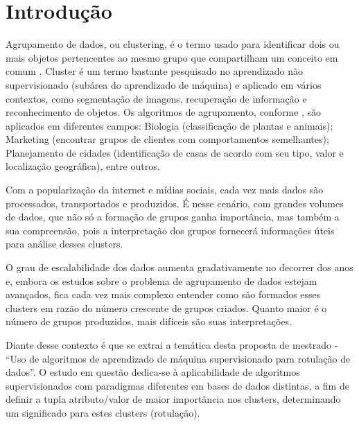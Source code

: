 

\chapter{Introdução} \label{cap:introd}

Agrupamento de dados, ou clustering, é o termo usado para identificar dois ou  mais objetos pertencentes ao mesmo grupo que compartilham um conceito em comum    \cite{Kumar2013}. Cluster é um termo bastante pesquisado no aprendizado não supervisionado (subárea do aprendizado de máquina) e aplicado em vários contextos, como segmentação de imagens, recuperação de informação e reconhecimento de objetos. Os algoritmos de agrupamento, conforme \cite{Kumar2013}, são aplicados em diferentes campos: Biologia (classificação de plantas e animais); Marketing (encontrar grupos de clientes com comportamentos semelhantes); Planejamento de cidades (identificação de casas de acordo com seu tipo, valor e localização geográfica), entre outros. 


Com a popularização da internet e mídias sociais, cada vez mais dados são processados, transportados e produzidos. É nesse cenário, com grandes volumes de dados, que não só a formação de grupos ganha importância, mas também a sua compreensão, pois a interpretação dos grupos fornecerá informações úteis para análise desses clusters. 

O grau de escalabilidade dos dados aumenta gradativamente no decorrer dos anos e, embora os estudos sobre o problema de agrupamento de dados estejam avançados, fica cada vez mais complexo entender como são formados esses clusters em razão do número crescente de grupos criados. Quanto maior é o número de grupos produzidos, mais difíceis são suas interpretações. 

Diante desse contexto é que se extrai a temática desta proposta de mestrado - “Uso de algoritmos de aprendizado de máquina supervisionado para rotulação de dados”. O estudo em questão dedica-se à aplicabilidade de algoritmos supervisionados com paradigmas diferentes em bases de dados distintas, a fim de definir a tupla atributo/valor de maior importância nos clusters, determinando um significado para estes clusters (rotulação). 


